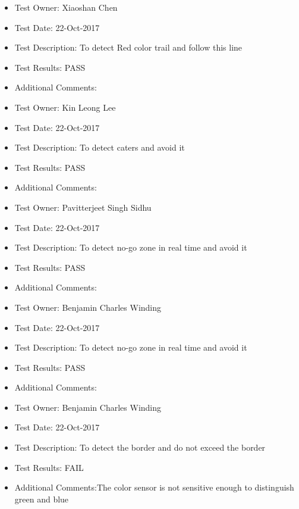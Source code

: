\documentclass[10pt,a4paper,titlepage]{article}
\begin{document}
\begin{itemize}
	\item Test Owner:  Xiaoshan Chen
	\item Test Date: 22-Oct-2017
	\item Test Description: To detect Red color trail and follow this line
	\item Test Results: PASS
	\item Additional Comments:	
\end{itemize}


\begin{itemize}
	\item Test Owner:  Kin Leong Lee
	\item Test Date: 22-Oct-2017
	\item Test Description: To detect caters and avoid it
	\item Test Results: PASS
	\item Additional Comments:
	
\end{itemize}


\begin{itemize}
	\item Test Owner:  Pavitterjeet Singh Sidhu
	\item Test Date: 22-Oct-2017
	\item Test Description: To detect no-go zone in real time and avoid it
	\item Test Results: PASS
	\item Additional Comments:	
\end{itemize}


\begin{itemize}
	\item Test Owner: Benjamin Charles Winding
	\item Test Date: 22-Oct-2017
	\item Test Description: To detect no-go zone in real time and avoid it
	\item Test Results: PASS
	\item Additional Comments:
	
\end{itemize}


\begin{itemize}
	\item Test Owner: Benjamin Charles Winding
	\item Test Date: 22-Oct-2017
	\item Test Description: To detect the border and do not exceed the border
	\item Test Results: FAIL
	\item Additional Comments:The color sensor is not sensitive enough to distinguish green and blue
\end{itemize}		
\end{document}
